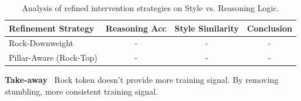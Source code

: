 \begin{table}[h]
\centering
\caption{Analysis of refined intervention strategies on Style vs. Reasoning Logic.}
\label{tab:additional_analysis}
\begin{tabular}{lccc}
\toprule
\textbf{Refinement Strategy} & \textbf{Reasoning Acc} & \textbf{Style Similarity} & \textbf{Conclusion} \\ \midrule
Rock-Downweight              & -                      & -                         & -                   \\
Pillar-Aware (Rock-Top)      & -                      & -                         & -                   \\ \bottomrule
\end{tabular}
\end{table}



\begin{takeaway}
\textcolor{tabblue}{\textbf{Take-away}}~
Rock token doesn't provide more training signal.
By removing stumbling, more consistent training signal.
\end{takeaway}